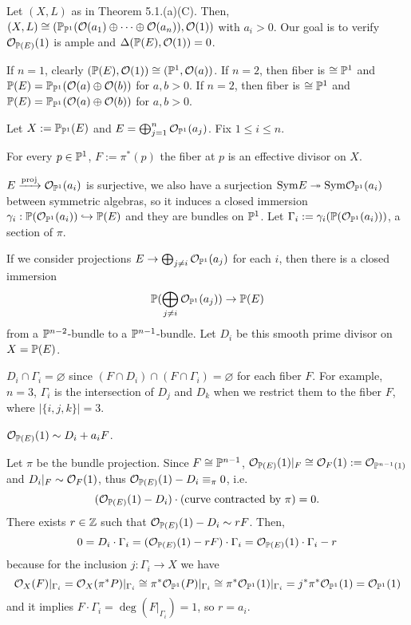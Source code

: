 \documentclass{../../small}
\begin{document}
\begin{rmk}
Let $(X,L)$ as in Theorem 5.1.(a)(C).
Then, $(X,L)\cong(\P_{\P^1}(\cO(a_1)\oplus\cdots\oplus\cO(a_n)),\cO(1))$ with $a_i>0$.
Our goal is to verify $\cO_{\P(E)}(1)$ is ample and $\Delta(\P(E),\cO(1))=0$.

If $n=1$, clearly $(\P(E),\cO(1))\cong(\P^1,\cO(a))$.
If $n=2$, then fiber is $\cong\P^1$ and $\P(E)=\P_{\P^1}(\cO(a)\oplus\cO(b))$ for $a,b>0$.
If $n=2$, then fiber is $\cong\P^1$ and $\P(E)=\P_{\P^1}(\cO(a)\oplus\cO(b))$ for $a,b>0$.
\end{rmk}

\begin{rmk}[$F,D_i,\Gamma_i$]
Let $X:=\P_{\P^1}(E)$ and $E=\bigoplus_{j=1}^n\cO_{\P^1}(a_j)$.
Fix $1\le i\le n$.
\begin{parts}
\item For every $p\in\P^1$, $F:=\pi^*(p)$ the fiber at $p$ is an effective divisor on $X$.
\item $E\xrightarrow{\mathrm{proj}}\cO_{\P^1}(a_i)$ is surjective, we also have a surjection $\mathrm{Sym}E\twoheadrightarrow\mathrm{Sym}\cO_{\P^1}(a_i)$ between symmetric algebras, so it induces a closed immersion $\gamma_i:\P(\cO_{\P^1}(a_i))\hookrightarrow\P(E)$ and they are bundles on $\P^1$.
Let $\Gamma_i:=\gamma_i(\P(\cO_{\P^1}(a_i)))$, a section of $\pi$.
\item If we consider projections $E\to\bigoplus_{j\ne i}\cO_{\P^1}(a_j)$ for each $i$, then there is a closed immersion \[\P(\bigoplus_{j\ne i}\cO_{\P^1}(a_j))\to\P(E)\] from a $\P^{n-2}$-bundle to a $\P^{n-1}$-bundle.
Let $D_i$ be this smooth prime divisor on $X=\P(E)$.
\end{parts}
\end{rmk}
\begin{rmk}
$D_i\cap\Gamma_i=\varnothing$ since $(F\cap D_i)\cap(F\cap\Gamma_i)=\varnothing$ for each fiber $F$.
For example, $n=3$, $\Gamma_i$ is the intersection of $D_j$ and $D_k$ when we restrict them to the fiber $F$, where $|\{i,j,k\}|=3$.
\end{rmk}
\begin{prop}
$\cO_{\P(E)}(1)\sim D_i+a_iF$.
\end{prop}
\begin{pf}
Let $\pi$ be the bundle projection.
Since $F\cong\P^{n-1}$, $\cO_{\P(E)}(1)|_F\cong\cO_F(1):=\cO_{\P^{n-1}(1)}$ and $D_i|_F\sim\cO_F(1)$, thus $\cO_{\P(E)}(1)-D_i\equiv_\pi0$, i.e.
\[(\cO_{\P(E)}(1)-D_i)\cdot(\text{curve contracted by $\pi$})=0.\]
There exists $r\in\Z$ such that $\cO_{\P(E)}(1)-D_i\sim rF$.
Then,
\[0=D_i\cdot\Gamma_i=(\cO_{\P(E)}(1)-rF)\cdot\Gamma_i=\cO_{\P(E)}(1)\cdot\Gamma_i-r\]
because for the inclusion $j:\Gamma_i\to X$ we have
\[\cO_X(F)|_{\Gamma_i}=\cO_X(\pi^*P)|_{\Gamma_i}\cong\pi^*\cO_{\P^1}(P)|_{\Gamma_i}\cong\pi^*\cO_{\P^1}(1)|_{\Gamma_i}=j^*\pi^*\cO_{\P^1}(1)=\cO_{\P^1}(1)\]
and it implies $F\cdot\Gamma_i=\deg(F|_{\Gamma_i})=1$, so $r=a_i$.
\end{pf}
\end{document}
